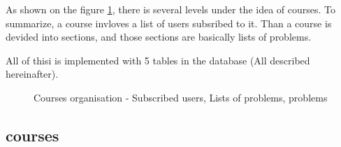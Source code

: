 As shown on the figure \ref{fig:courses_orga}, there is several levels under the idea of courses.
To summarize, a course invloves a list of users subsribed to it. Than a course is devided into sections, and those sections are basically lists of problems.

All of thisi is implemented with 5 tables in the database (All described hereinafter).

\begin{figure}[h!]
\centering
{}
\caption[Courses organisation]{Courses organisation - Subscribed users, Lists of problems, problems }
\label{fig:courses_orga}
\end{figure}



\subsection{courses} %
\begin{figure}
  \vspace{-20pt}
  \begin{center}
  \end{center}
  \vspace{-20pt}
\end{figure}

